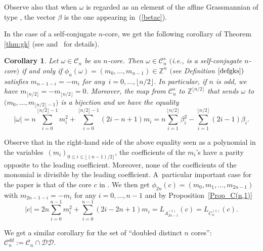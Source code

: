 \documentclass[pdftex]{sigma}
\newtheorem{Corollary}[Theorem]{Corollary}
\numberwithin{equation}{section}
\newcommand{\cC}{\mathcal{C}}
\def\ccdd{\mathcal {DD}}
\newcommand{\Z}{\mathbb{Z}}
\begin{document}
\begin{Remark}
	Observe also that when $\omega $ is regarded as an element of the affine
	Grassmannian of type , the vector $\beta $ is the one appearing
	in~(\ref{betac}).
\end{Remark}

In the case of a self-conjugate $n$-core, we get the following corollary of
Theorem \ref{thm:gk} (see \mbox{\cite[Sections~$7$ and~$8$]{GKS}} and~\cite[Section $%
4.1$]{Wmac} for details).

\begin{Corollary}\label{cor:gksc} Let $\omega \in \cC_{n}$ be an $n$-core. Then $\omega \in \cC_{n}^{s}$ $($i.e., is a self-conjugate $n$-core$)$ if and only if
    $\phi_{n}(\omega )=(m_{0},\dots ,m_{n-1})\in \Z^{n}$ $($see Definition $\ref{defgks})$ satisfies $m_{n-1-i}=-m_{i}$ for any~${i=0,\dots ,\lfloor n/2\rfloor}$. In
	particular, if $n$ is odd, we have $m_{\lfloor n/2\rfloor }=-m_{\lfloor
		n/2\rfloor }=0$. Moreover, the map from $\cC_{n}^{s}$ to $\Z^{\lfloor
		n/2\rfloor }$ that sends $\omega $ to $\bigl(m_{0},\dots ,m_{\lfloor n/2\rfloor
		-1}\bigr)$ is a bijection and we have the equality
	\begin{equation*}
	\lvert \omega \rvert =n\sum_{i=0}^{\lfloor n/2\rfloor
		-1}m_{i}^{2}+\sum_{i=0}^{\lfloor n/2\rfloor
		-1}(2i-n+1)m_{i}=n\sum_{i=1}^{\lfloor n/2\rfloor }\beta
	_{i}^{2}-\sum_{i=1}^{\lfloor n/2\rfloor }(2i-1)\beta _{i}.
	\end{equation*}
\end{Corollary}

Observe that in the right-hand side of the above equality seen as a polynomial in the variables~$(m_i)_{0\leq i \leq \lfloor (n-1)/2\rfloor }$,
 the coefficients of the $m_{i}$'s have a parity opposite to the leading coefficient.
Moreover, none of the coefficients of the monomial is divisible by the
leading coefficient. A~particular important case for the paper is that of
the core $c$ in . We then get ${\phi
_{2n}(c)=(m_{0},m_{1},\dots ,m_{2n-1})}$ with $m_{2n-1-i}=-m_{i}$ for any $%
i=0,\dots ,n-1$ and by Proposition~\ref{Prop_C(n,1)}
\begin{equation}
\lvert c\rvert
=2n\sum_{i=0}^{n-1}m_{i}^{2}+%
\sum_{i=0}^{n-1}(2i-2n+1)m_{i}=L_{A_{2n-1}^{(1)}}(c)=L_{C_{n}^{(1)}}(c).
\label{eq:Lc}
\end{equation}



We get a similar corollary for the set of ``doubled distinct $n$ cores'': $\cC%
_{n}^{dd}:=\cC_{n}\cap \ccdd$.
\end{document}
